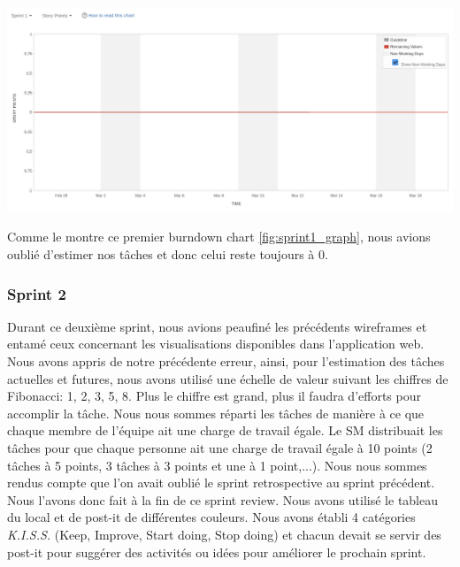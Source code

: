 \documentclass[t, 12pt, usenames,dvipsnames]{article}
\begin{document}
                
                 \begin{center}
                    \includegraphics[scale=.25]{images/graph-new/sprint1.png}
                    \label{fig:sprint1_graph}
                \end{center}
                Comme le montre ce premier burndown chart \ref{fig:sprint1_graph}, nous avions oublié d'estimer nos tâches et donc celui reste toujours à 0.
                
                
            \subsubsection{Sprint 2}
                \noindent Durant ce deuxième sprint, nous avions peaufiné les précédents wireframes et entamé ceux concernant les visualisations disponibles dans l'application web. Nous avons appris de notre précédente erreur, ainsi, pour l'estimation des tâches actuelles et futures, nous avons utilisé une échelle de valeur suivant les chiffres de Fibonacci: 1, 2, 3, 5, 8. Plus le chiffre est grand, plus il faudra d'efforts pour accomplir la tâche. Nous nous sommes réparti les tâches de manière à ce que chaque membre de l'équipe ait une charge de travail égale. Le SM distribuait les tâches pour que chaque personne ait une charge de travail égale à 10 points (2 tâches à 5 points, 3 tâches à 3 points et une à 1 point,...).
                \newline
                Nous nous sommes rendus compte que l'on avait oublié le sprint retrospective au sprint précédent. Nous l'avons donc fait à la fin de ce sprint review. 
                Nous avons utilisé le tableau du local et de post-it de différentes couleurs. Nous avons établi 4 catégories \textit{K.I.S.S.} (Keep, Improve, Start doing, Stop doing) et chacun devait se servir des post-it pour suggérer des activités ou idées pour améliorer le prochain sprint.
\end{document}
